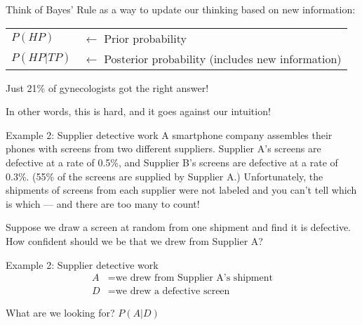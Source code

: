 \documentclass{beamer}\usepackage[]{graphicx}\usepackage[]{color}
\begin{document}
\begin{darkframes}
\begin{frame}
  Think of Bayes' Rule as a way to update our thinking based on new information:

  \bigskip

  \begin{center}
    \begin{tabular}{ll}
      $P(HP)$ & $\longleftarrow$ Prior probability \\
      $P(HP|TP)$ & $\longleftarrow$ Posterior probability (includes new information) \\
    \end{tabular}
  \end{center}
  \lc
\end{frame}

\begin{frame}
  \lc
\end{frame}

\begin{frame}
  Just 21\% of gynecologists got the right answer!
  \bigskip\pause

  In other words, this is hard, and it goes against our intuition!
\end{frame}

\begin{frame}{Example 2: Supplier detective work}
  A smartphone company assembles their phones with screens from two different suppliers. Supplier A's screens are defective at a rate of 0.5\%, and Supplier B's screens are defective at a rate of 0.3\%. (55\% of the screens are supplied by Supplier A.) Unfortunately, the shipments of screens from each supplier were not labeled and you can't tell which is which --- and there are too many to count!

  \bigskip\pause

  Suppose we draw a screen at random from one shipment and find it is defective. \pause How confident should we be that we drew from Supplier A?
\end{frame}

\begin{frame}{Example 2: Supplier detective work}
  \begin{align*}
    A &= \text{we drew from Supplier A's shipment} \\
    D &= \text{we drew a defective screen}
  \end{align*}

  \pause
  What are we looking for?
  \pause
  $P(A|D)$
  \bigskip\pause


\end{frame}
\end{darkframes}
\end{document}
